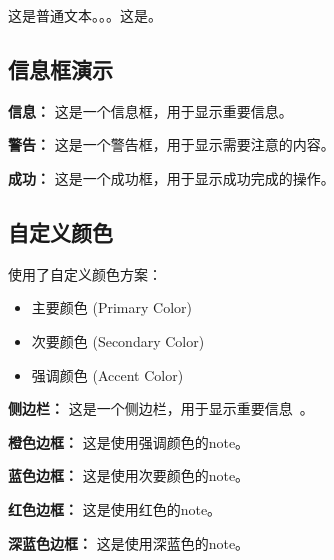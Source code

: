 \documentclass[11pt,a4paper]{article}
\begin{document}
这是普通文本。。。这是。

\subsection{信息框演示}

\begin{infobox}
    \textbf{信息：} 这是一个信息框，用于显示重要信息。
\end{infobox}

\begin{warningbox}
    \textbf{警告：} 这是一个警告框，用于显示需要注意的内容。
\end{warningbox}

\begin{successbox}
    \textbf{成功：} 这是一个成功框，用于显示成功完成的操作。
\end{successbox}

\subsection{自定义颜色}

使用了自定义颜色方案：
\begin{itemize}
    \item \textcolor{primarycolor}{主要颜色 (Primary Color)}
    \item \textcolor{secondarycolor}{次要颜色 (Secondary Color)}
    \item \textcolor{accentcolor}{强调颜色 (Accent Color)}
\end{itemize}

\begin{note}
    \textbf{侧边栏：} 这是一个侧边栏，用于显示重要信息~\cite{key}。
\end{note}

\begin{note}[accentcolor]
    \textbf{橙色边框：} 这是使用强调颜色的note。
\end{note}

\begin{note}[secondarycolor]
    \textbf{蓝色边框：} 这是使用次要颜色的note。
\end{note}

\begin{note}[red]
    \textbf{红色边框：} 这是使用红色的note。
\end{note}

\begin{note}
    \textbf{深蓝色边框：} 这是使用深蓝色的note。
\end{note}



\end{document}
